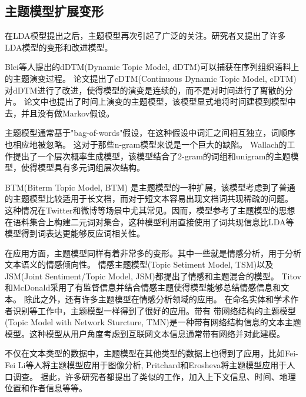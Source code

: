\subsection{主题模型扩展变形}
在LDA模型提出之后，主题模型再次引起了广泛的关注。研究者又提出了许多LDA模型的变形和改进模型。

Blei等人提出的dDTM(Dynamic Topic Model, dDTM)\cite{blei2006dynamic}可以捕获在序列组织语料上的主题演变过程。
论文\cite{wang2012continuous}提出了cDTM(Continuous Dynamic Topic Model, cDTM)对dDTM进行了改进，使得模型的演变是连续的，而不是对时间进行了离散的分片。
论文\cite{wang2006topics}中也提出了时间上演变的主题模型，该模型显式地将时间建模到模型中去，并且没有做Markov假设。

主题模型通常基于"bag-of-words"假设，在这种假设中词汇之间相互独立，词顺序也相应地被忽略。
这对于那些n-gram模型来说是一个巨大的缺陷。
Wallach的工作\cite{wallach2006topic}提出了一个层次概率生成模型，该模型结合了2-gram的词组和unigram的主题模型，使得模型具有多元词组层次结构。

BTM(Biterm Topic Model, BTM) \cite{yan2013biterm}是主题模型的一种扩展，该模型考虑到了普通的主题模型比较适用于长文档，而对于短文本容易出现文档词共现稀疏的问题。
这种情况在Twitter和微博等场景中尤其常见。因而，模型参考了主题模型的思想在语料集合上构建二元词对集合，这种模型利用直接使用了词共现信息比LDA等模型得到词表达更能够反应词相关性。

在应用方面，主题模型同样有着非常多的变形。其中一些就是情感分析，用于分析文本语义的情感倾向性。
情感主题模型(Topic Setiment Model, TSM)\cite{mei2007topic}以及JSM(Joint Sentiment/Topic Model, JSM)\cite{lin2009joint}都提出了情感和主题混合的模型。
Titov和McDonald\cite{titov2008modeling, titov2008joint}采用了有监督信息并结合情感主题使得模型能够总结情感信息和文本。
除此之外，还有许多主题模型在情感分析领域的应用\cite{lu2011multi, jo2011aspect, li2010sentiment, si2013exploiting}。
在命名实体\cite{han2012entity, newman2006statistical, shu2009latent, kim2012etm}和学术作者识别\cite{rosen2004author}等工作中，主题模型一样得到了很好的应用。带有
带网络结构的主题模型(Topic Model with Network Sturcture, TMN)\cite{mei2008topic}是一种带有网络结构信息的文本主题模型。这种模型从用户角度考虑到互联网文本信息通常带有网络并对此建模。

不仅在文本类型的数据中，主题模型在其他类型的数据上也得到了应用，比如Fei-Fei Li等人将主题模型应用于图像分析\cite{fei2005bayesian, sivic2005discovering}, 
Pritchard\cite{pritchard2000inference}和Erosheva\cite{erosheva2002grade}将主题模型应用于人口调查。
据此，许多研究者都提出了类似的工作，加入上下文信息\cite{mei2006mixture}、时间\cite{wang2006topics}、地理位置和作者信息等等。

